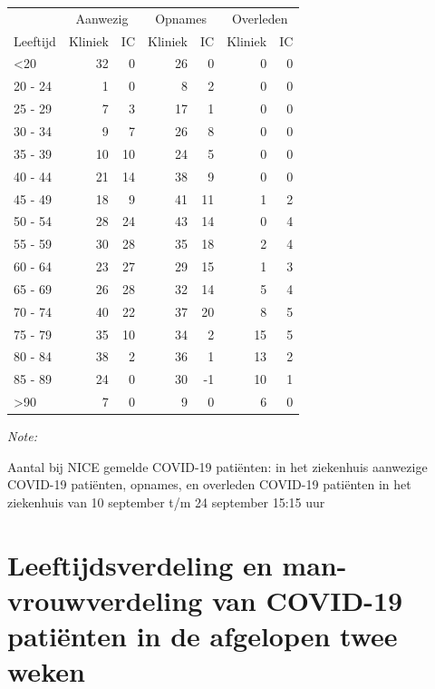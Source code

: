 \documentclass[
  english,
  man,floatsintext]{apa6}
\begin{document}
\begin{table}
\centering\begingroup\fontsize{10}{12}\selectfont

\begin{threeparttable}
\begin{tabular}{lrrrrrr}
\toprule
\multicolumn{1}{c}{ } & \multicolumn{2}{c}{Aanwezig} & \multicolumn{2}{c}{Opnames} & \multicolumn{2}{c}{Overleden} \\
\cmidrule(l{3pt}r{3pt}){2-3} \cmidrule(l{3pt}r{3pt}){4-5} \cmidrule(l{3pt}r{3pt}){6-7}
Leeftijd & Kliniek & IC & Kliniek & IC & Kliniek & IC\\
\midrule
<20 & 32 & 0 & 26 & 0 & 0 & 0\\
20 - 24 & 1 & 0 & 8 & 2 & 0 & 0\\
25 - 29 & 7 & 3 & 17 & 1 & 0 & 0\\
30 - 34 & 9 & 7 & 26 & 8 & 0 & 0\\
35 - 39 & 10 & 10 & 24 & 5 & 0 & 0\\
40 - 44 & 21 & 14 & 38 & 9 & 0 & 0\\
45 - 49 & 18 & 9 & 41 & 11 & 1 & 2\\
50 - 54 & 28 & 24 & 43 & 14 & 0 & 4\\
55 - 59 & 30 & 28 & 35 & 18 & 2 & 4\\
60 - 64 & 23 & 27 & 29 & 15 & 1 & 3\\
65 - 69 & 26 & 28 & 32 & 14 & 5 & 4\\
70 - 74 & 40 & 22 & 37 & 20 & 8 & 5\\
75 - 79 & 35 & 10 & 34 & 2 & 15 & 5\\
80 - 84 & 38 & 2 & 36 & 1 & 13 & 2\\
85 - 89 & 24 & 0 & 30 & -1 & 10 & 1\\
>90 & 7 & 0 & 9 & 0 & 6 & 0\\
\bottomrule
\end{tabular}
\begin{tablenotes}
\item \textit{Note: } 
\item Aantal bij NICE gemelde COVID-19 patiënten: in het ziekenhuis aanwezige COVID-19 patiënten, opnames, en overleden COVID-19 patiënten in het ziekenhuis van 10 september t/m 24 september 15:15 uur
\end{tablenotes}
\end{threeparttable}
\endgroup{}
\end{table}

\newpage

\hypertarget{leeftijdsverdeling-en-man-vrouwverdeling-van-covid-19-patiuxebnten-in-de-afgelopen-twee-weken}{%
\section{Leeftijdsverdeling en man-vrouwverdeling van COVID-19 patiënten in de afgelopen twee weken}\label{leeftijdsverdeling-en-man-vrouwverdeling-van-covid-19-patiuxebnten-in-de-afgelopen-twee-weken}}
\end{document}
